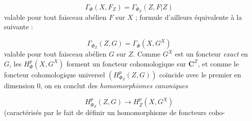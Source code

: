 \[
\Gamma_\Phi(X,F_Z)=\Gamma_{\Phi_Z}(Z,F\vert Z)
\]
valable pour tout faisceau abélien $F$ sur $X$ ; formule d'ailleurs équivalente
à la suivante :

\[
\Gamma_{\Phi_Z}(Z,G)=\Gamma_\Phi(X,G^X)
\]
valable pour tout faisceau abélien $G$ sur $Z$.
Comme $G^X$ est un foncteur \textit{exact} en $G$, les $H^p_\Phi(X,G^X)$
forment un foncteur cohomologique sur $\mathbf C^Z$, et comme le foncteur cohomologique
universel $(H^p_{\Phi_Z}(Z,G))$ coïncide avec le premier en dimension 0, on en
conclut des \textit{homomorphismes canoniques}

\[
H^p_{\Phi_Z}(Z,G)\to H^p_Z(X,G^X)
\]
(caractérisés par le fait de définir un homomorphisme de foncteurs coho-

